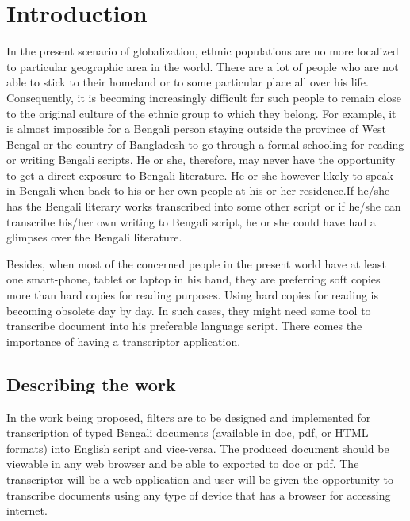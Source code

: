 \documentclass[12pt,oneside,openany,a4paper]{book}
\begin{document}
\tableofcontents
\listoffigures


\chapter{Introduction}
In the present scenario of globalization, ethnic populations are no more localized to particular geographic area in the world. There are a lot of people who are not able to stick to their homeland or to some particular place all over his life. Consequently, it is becoming increasingly difficult for such people to remain close to the original culture of the ethnic group to which they belong. For example, it is almost impossible for a Bengali person staying outside the province of West Bengal or the country of Bangladesh to go through a formal schooling for reading or writing Bengali scripts. He or she, therefore, may never have the opportunity to get a direct exposure to Bengali literature. He or she however likely to speak in Bengali when back to his or her own people at his or her residence.If he/she has the Bengali literary works transcribed into some other script or if he/she can transcribe his/her own writing to Bengali script, he or she could have had a glimpses over the Bengali literature.
\par \vspace{0.3cm}
Besides, when most of the concerned people in the present world have at least one smart-phone, tablet or laptop in his hand, they are preferring soft copies more than hard copies for reading purposes. Using hard copies for reading is becoming obsolete day by day. In such cases, they might need some tool to transcribe document into his preferable language script. There comes the importance of having a transcriptor application.

\section{Describing the work}
In the work being proposed, filters are to be designed and implemented for transcription of typed Bengali documents (available in doc, pdf, or HTML formats) into English script and vice-versa. The produced document should be viewable in any web browser and be able to exported to doc or pdf. The transcriptor will be a web application and user will be given the opportunity to transcribe documents using any type of device that has a browser for accessing internet. 
\end{document}

